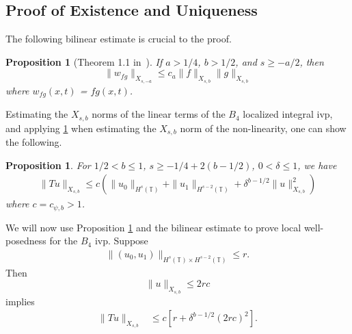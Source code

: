 \documentclass[12pt,reqno]{amsart}
\numberwithin{equation}{section}  %
\newcommand{\ci}{\mathbb{T}}
\newtheorem{proposition}[theorem]{Proposition}
\begin{document}
\subsection{Proof of Existence and Uniqueness}
\label{sec:proof-b4-per-case}
%
%
%
%				 
%
The following bilinear
estimate is crucial to the proof.
%
%
%
%
%
%
%
%
\begin{proposition}[Theorem 1.1 in~\cite{Farah:2009uq}]
\label{prop:bilinear-est}
	If $a > 1/4$, $b > 1/2$, and $s \ge -a/2$, 
  then 
	\begin{equation}
    \| w_{fg} \|_{X_{s,-a}}
		    \le c_{a} \|f\|_{X_{s,b}} \|g\|_{X_{s,b}}
	\end{equation}
  where $w_{fg}(x,t)$ = $fg (x,t)$.
%
%
%
%
\end{proposition}
%
Estimating the $X_{s,b}$ norms of the linear terms of the $B_{4}$ localized
integral ivp, and applying \ref{prop:bilinear-est} when estimating the
$X_{s,b}$ norm of the non-linearity,
one can show the following.
%
\begin{proposition}
\label{prop:contraction}
%
For $1/2 < b \le 1$, $s \ge -1/4 + 2(b -1/2)$, $0 < \delta \le 1$, we have
%
\begin{equation*}
	\begin{split}
    \|Tu\|_{X_{s,b}} \le c \left( \|u_0 \|_{H^s(\ci)} + \|u_1 \|_{H^{s-2}(\ci)}
    + \delta^{b-1/2} \|u\|_{X_{s,b}}^2 
		\right)
	\end{split}
\end{equation*}
%
where $c = c_{\psi, b} > 1$.  
\end{proposition}
%
We will now use Proposition \ref{prop:contraction} and the bilinear estimate
to prove local well-posedness for the 
$B_4$ ivp. Suppose
%
\begin{equation*}
	\begin{split}
    \|(u_0, u_{1})\|_{H^s(\ci) \times H^{s-2}(\ci)} \le r.
  \end{split}
\end{equation*}
%
Then $$\|u\|_{X_{s,b}} \le 2rc$$ implies
%
\begin{equation*}
	\begin{split}
		\|Tu \|_{X_{s,b}} 
    & \le c \left[ r + \delta^{b - 1/2} \left( 
		2rc \right)^2 \right].
	\end{split}
\end{equation*}
\end{document}
